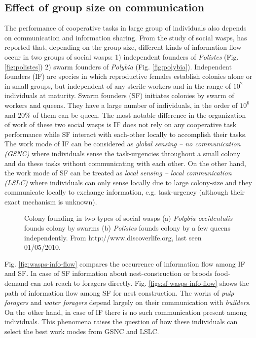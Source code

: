 \subsection{Effect of group size on communication}
\label{bg:bio-comm:group-size}
The performance of cooperative tasks in large group of individuals also depends on communication and information sharing. From the study of social wasps,   has reported that, depending on the group size, different kinds of information flow occur in two groups of social wasps: 1) independent founders of {\em Polistes} (Fig. \ref {fig:polistes}) 2) swarm founders of {\em Polybia} (Fig. \ref {fig:polybia}). Independent founders (IF) are species in which reproductive females establish colonies alone or in small groups, but independent of any sterile workers and in the range of $10^2$ individuals at maturity. Swarm founders (SF) initiates colonies by swarm of workers and queens. They have a large number of individuals, in the order of $10^6$ and 20\% of them can be queen. The most notable difference in the  organization of work of these two social wasps is IF does not rely on any cooperative task performance while SF interact with each-other locally to accomplish their tasks. The work mode of IF can be considered as {\em global sensing – no communication (GSNC)} where individuals sense the task-urgencies throughout a small colony and do these tasks without communicating with each other. On the other hand, the work mode of SF can be treated as {\em local sensing – local communication (LSLC)} where individuals can only sense locally due to large colony-size and they communicate locally to exchange information, e.g. task-urgency (although their exact mechanism is unknown).\\
\begin{figure}
\centering
{} 
\hspace{0.25cm}
\caption{Colony founding in two types of social wasps (a) {\em Polybia occidentalis}  founds colony by swarms (b) {\em Polistes}  founds colony by a few queens independently. From http://www.discoverlife.org, last seen 01/05/2010.}
\label{fig:social-wasps}
\end{figure}
Fig. \ref{fig:wasps-info-flow} compares the occurrence of information flow among IF and SF. In case of SF information about nest-construction or broods food-demand can not reach to foragers directly. Fig. \ref{figs:sf-wasps-info-flow} shows the path of information flow among SF for nest construction. The works of {\em pulp foragers} and {\em water foragers} depend largely on their communication with {\em builders}. On the other hand, in case of IF there is no such communication present among individuals. This phenomena raises the question of how these individuals can select the best work modes from GSNC and LSLC.\\
